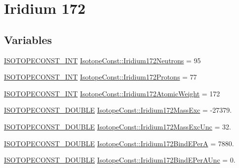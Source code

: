 \hypertarget{group___isotope_const-_iridium-_ir172}{}\section{Iridium 172}
\label{group___isotope_const-_iridium-_ir172}
\subsection*{Variables}
\begin{DoxyCompactItemize}
\item 
\mbox{\hyperlink{group___isotope_const-_macros_ga5f18360b3e99483a35c32d789e62621c}{I\+S\+O\+T\+O\+P\+E\+C\+O\+N\+S\+T\+\_\+\+I\+NT}} \mbox{\hyperlink{group___isotope_const-_iridium-_ir172_ga34fa02e504ab820940f7282f9ef79555}{Isotope\+Const\+::\+Iridium172\+Neutrons}} = 95
\item 
\mbox{\hyperlink{group___isotope_const-_macros_ga5f18360b3e99483a35c32d789e62621c}{I\+S\+O\+T\+O\+P\+E\+C\+O\+N\+S\+T\+\_\+\+I\+NT}} \mbox{\hyperlink{group___isotope_const-_iridium-_ir172_gafbbb65aee311b86a75f773213a70392b}{Isotope\+Const\+::\+Iridium172\+Protons}} = 77
\item 
\mbox{\hyperlink{group___isotope_const-_macros_ga5f18360b3e99483a35c32d789e62621c}{I\+S\+O\+T\+O\+P\+E\+C\+O\+N\+S\+T\+\_\+\+I\+NT}} \mbox{\hyperlink{group___isotope_const-_iridium-_ir172_ga9399363ca97b0a662b516ac5cd4870ca}{Isotope\+Const\+::\+Iridium172\+Atomic\+Weight}} = 172
\item 
\mbox{\hyperlink{group___isotope_const-_macros_ga8f45a7272ce02c0b4c65c44636ed719a}{I\+S\+O\+T\+O\+P\+E\+C\+O\+N\+S\+T\+\_\+\+D\+O\+U\+B\+LE}} \mbox{\hyperlink{group___isotope_const-_iridium-_ir172_gaeb1f6b8cbcab789cde299bf8318c2e92}{Isotope\+Const\+::\+Iridium172\+Mass\+Exc}} = -\/27379.
\item 
\mbox{\hyperlink{group___isotope_const-_macros_ga8f45a7272ce02c0b4c65c44636ed719a}{I\+S\+O\+T\+O\+P\+E\+C\+O\+N\+S\+T\+\_\+\+D\+O\+U\+B\+LE}} \mbox{\hyperlink{group___isotope_const-_iridium-_ir172_ga754327bbf0bc989e62923692f2b55ae3}{Isotope\+Const\+::\+Iridium172\+Mass\+Exc\+Unc}} = 32.
\item 
\mbox{\hyperlink{group___isotope_const-_macros_ga8f45a7272ce02c0b4c65c44636ed719a}{I\+S\+O\+T\+O\+P\+E\+C\+O\+N\+S\+T\+\_\+\+D\+O\+U\+B\+LE}} \mbox{\hyperlink{group___isotope_const-_iridium-_ir172_ga01673ba6924705f7636f50cf19838f66}{Isotope\+Const\+::\+Iridium172\+Bind\+E\+PerA}} = 7880.
\item 
\mbox{\hyperlink{group___isotope_const-_macros_ga8f45a7272ce02c0b4c65c44636ed719a}{I\+S\+O\+T\+O\+P\+E\+C\+O\+N\+S\+T\+\_\+\+D\+O\+U\+B\+LE}} \mbox{\hyperlink{group___isotope_const-_iridium-_ir172_ga1479ded844cca6d3e144681bbcbc2c22}{Isotope\+Const\+::\+Iridium172\+Bind\+E\+Per\+A\+Unc}} = 0.

\end{DoxyCompactItemize}
